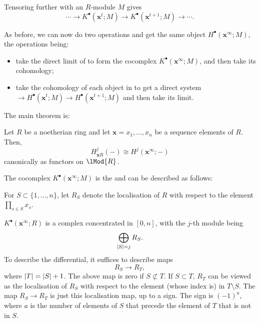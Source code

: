 \documentclass[12pt]{article}
\begin{document}
Tensoring further with an $R$-module $M$ gives
\begin{equation} \label{eq:004}
	\cdots \to K^{\bullet}(\mathbf{x}^{t}; M) \to K^{\bullet}(\mathbf{x}^{t + 1}; M) \to \cdots.
\end{equation}

As before, we can now do two operations and get the same object $H^{\bullet}(\mathbf{x}^{\infty}; M)$, the operations being:
\begin{itemize}
	\item take the direct limit of  to form the cocomplex $K^{\bullet}(\mathbf{x}^{\infty}; M)$, and then take its cohomology;
	\item take the cohomology of each object in  to get a direct system $\to H^{\bullet}(\mathbf{x}^{t}; M) \to H^{\bullet}(\mathbf{x}^{t + 1}; M)$ and then take its limit.
\end{itemize}

The main theorem is:
\begin{thm} \label{thm:cech-cohomology-is-local-cohomology}
	Let $R$ be a noetherian ring and let $\mathbf{x} = x_{1}, \ldots, x_{n}$ be a sequence elements of $R$. Then,
	\begin{equation*} 
		H_{\mathbf{x} R}^{j}(-) \cong H^{j}(\mathbf{x}^{\infty}; -)
	\end{equation*}
	canonically as functors on $\lMod{R}$.
\end{thm}

The cocomplex $K^{\bullet}(\mathbf{x}^{\infty}; M)$ is the  and can be described as follows: 

For $S \subset \{1, \ldots, n\}$, let $R_{S}$ denote the localisation of $R$ with respect to the element $\prod_{s \in S} x_{s}$.

$K^{\bullet}(\mathbf{x}^{\infty}; R)$ is a complex concentrated in $[0, n]$, with the $j$-th module being
\begin{equation*} 
	\bigoplus_{{\left\lvert S \right\lvert} = j} R_{S}.
\end{equation*}
To describe the differential, it suffices to describe maps
\begin{equation*} 
	R_{S} \to R_{T},
\end{equation*}
where ${\left\lvert T \right\lvert} = {\left\lvert S \right\lvert} + 1$. The above map is zero if $S \not\subset T$. If $S \subset T$, $R_{T}$ can be viewed as the localisation of $R_{S}$ with respect to the element (whose index is) in $T \setminus S$. The map $R_{S} \to R_{T}$ is just this localisation map, up to a sign. The sign is $(-1)^{a}$, where $a$ is the number of elements of $S$ that precede the element of $T$ that is not in $S$. 
\end{document}
